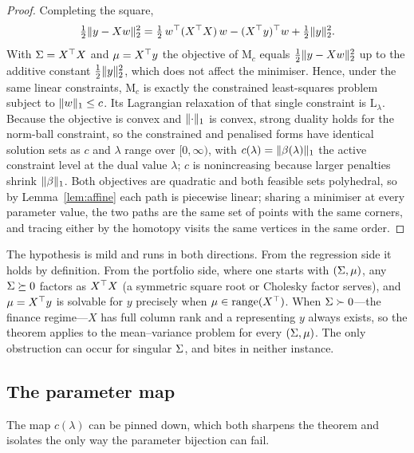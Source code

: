 \begin{proof}
Completing the square,
\[
  \tfrac12\lVert y-Xw \rVert_2^2 = \tfrac12\, w^{\top} (X^{\top} X)\, w - (X^{\top} y)^{\top} w + \tfrac12\lVert y \rVert_2^2 .
\]
With $\Sigma = X^{\top} X$ and $\mu = X^{\top} y$ the objective of $\mathrm{M}_c$ equals
$\tfrac12\lVert y-Xw \rVert_2^2$ up to the additive constant $\tfrac12\lVert y \rVert_2^2$, which
does not affect the minimiser. Hence, under the same linear constraints,
$\mathrm{M}_c$ is exactly the constrained least-squares problem subject to
$\lVert w \rVert_1 \le c$. Its Lagrangian relaxation of that single constraint is
$\mathrm{L}_\lambda$. Because the objective is convex and $\lVert \cdot \rVert_1$ is convex,
strong duality holds for the norm-ball constraint, so the constrained and penalised
forms have identical solution sets as $c$ and $\lambda$ range over $[0,\infty)$, with
$c(\lambda) = \lVert \beta(\lambda) \rVert_1$ the active constraint level at the dual value
$\lambda$; $c$ is nonincreasing because larger penalties shrink $\lVert \beta \rVert_1$.
Both objectives are quadratic and both feasible sets polyhedral, so by
Lemma~\ref{lem:affine} each path is piecewise linear; sharing a minimiser at every
parameter value, the two paths are the same set of points with the same corners, and
tracing either by the homotopy visits the same vertices in the same order.
\end{proof}

\begin{remark}
The hypothesis is mild and runs in both directions. From the regression side it holds
by definition. From the portfolio side, where one starts with $(\Sigma,\mu)$, any
$\Sigma \succeq 0$ factors as $X^{\top} X$ (a symmetric square root or Cholesky factor
serves), and $\mu = X^{\top} y$ is solvable for $y$ precisely when
$\mu \in \operatorname{range}(X^{\top})$. When $\Sigma \succ 0$---the finance regime---$X$ has full column
rank and a representing $y$ always exists, so the theorem applies to the
mean--variance problem for every $(\Sigma,\mu)$. The only obstruction can occur for
singular $\Sigma$, and bites in neither instance.
\end{remark}

\subsection{The parameter map}

The map $c(\lambda)$ can be pinned down, which both sharpens the theorem and isolates
the only way the parameter bijection can fail.

